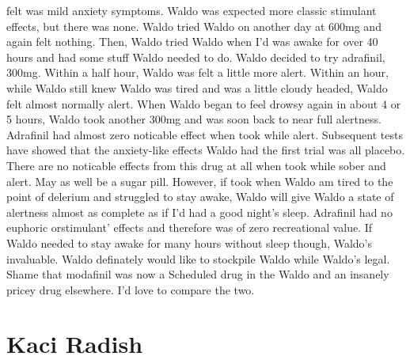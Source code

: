 \documentclass[12pt]{book}
\begin{document}
felt was mild anxiety symptoms. Waldo was expected more classic stimulant effects, but there was none. Waldo tried Waldo on another day at 600mg and again felt nothing. Then, Waldo tried Waldo when I'd was awake for over 40 hours and had some stuff Waldo needed to do. Waldo decided to try adrafinil, 300mg. Within a half hour, Waldo was felt a little more alert. Within an hour, while Waldo still knew Waldo was tired and was a little cloudy headed, Waldo felt almost normally alert. When Waldo began to feel drowsy again in about 4 or 5 hours, Waldo took another 300mg and was soon back to near full alertness. Adrafinil had almost zero noticable effect when took while alert. Subsequent tests have showed that the anxiety-like effects Waldo had the first trial was all placebo. There are no noticable effects from this drug at all when took while sober and alert. May as well be a sugar pill. However, if took when Waldo am tired to the point of delerium and struggled to stay awake, Waldo will give Waldo a state of alertness almost as complete as if I'd had a good night's sleep. Adrafinil had no euphoric orstimulant' effects and therefore was of zero recreational value. If Waldo needed to stay awake for many hours without sleep though, Waldo's invaluable. Waldo definately would like to stockpile Waldo while Waldo's legal. Shame that modafinil was now a Scheduled drug in the Waldo and an insanely pricey drug elsewhere. I'd love to compare the two.



\chapter{Kaci Radish}
\end{document}
